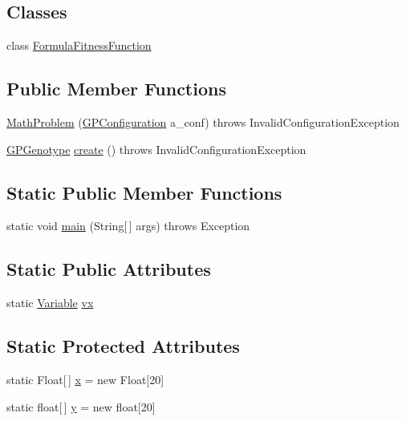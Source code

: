 \subsection*{Classes}
\begin{DoxyCompactItemize}
\item 
class \hyperlink{classexamples_1_1gp_1_1_math_problem_1_1_formula_fitness_function}{Formula\-Fitness\-Function}
\end{DoxyCompactItemize}
\subsection*{Public Member Functions}
\begin{DoxyCompactItemize}
\item 
\hyperlink{classexamples_1_1gp_1_1_math_problem_ae8b4e8d79d4e99dae85f239102b24857}{Math\-Problem} (\hyperlink{classorg_1_1jgap_1_1gp_1_1impl_1_1_g_p_configuration}{G\-P\-Configuration} a\-\_\-conf)  throws Invalid\-Configuration\-Exception 
\item 
\hyperlink{classorg_1_1jgap_1_1gp_1_1impl_1_1_g_p_genotype}{G\-P\-Genotype} \hyperlink{classexamples_1_1gp_1_1_math_problem_a4d7aa38be65189ab69155963e170c922}{create} ()  throws Invalid\-Configuration\-Exception 
\end{DoxyCompactItemize}
\subsection*{Static Public Member Functions}
\begin{DoxyCompactItemize}
\item 
static void \hyperlink{classexamples_1_1gp_1_1_math_problem_a2f9e11286dec9014d514b4884f9453b1}{main} (String\mbox{[}$\,$\mbox{]} args)  throws Exception 
\end{DoxyCompactItemize}
\subsection*{Static Public Attributes}
\begin{DoxyCompactItemize}
\item 
static \hyperlink{classorg_1_1jgap_1_1gp_1_1terminal_1_1_variable}{Variable} \hyperlink{classexamples_1_1gp_1_1_math_problem_a40167a51e121e6eca8a6dacb65646ff3}{vx}
\end{DoxyCompactItemize}
\subsection*{Static Protected Attributes}
\begin{DoxyCompactItemize}
\item 
static Float\mbox{[}$\,$\mbox{]} \hyperlink{classexamples_1_1gp_1_1_math_problem_a3d13d7836d2208696826f96bf7aa4f38}{x} = new Float\mbox{[}20\mbox{]}
\item 
static float\mbox{[}$\,$\mbox{]} \hyperlink{classexamples_1_1gp_1_1_math_problem_af6704afaefd4856330b42566157f5905}{y} = new float\mbox{[}20\mbox{]}
\end{DoxyCompactItemize}
